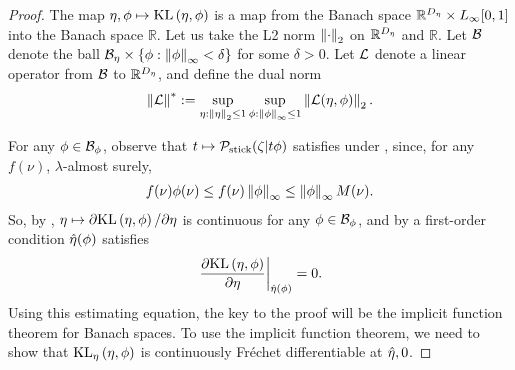 
\begin{proof}
%
The map $\eta, \phi \mapsto \mathrm{KL}\left(\eta, \phi\right)$ is a map from the Banach space
$\mathbb{R}^{D_{\eta}} \times {L_{\infty}[0,1]}$ into the Banach space $\mathbb{R}$. Let us
take the L2 norm $\left\Vert\cdot\right\Vert_2$ on $\mathbb{R}^{{D_{\eta}}}$ and $\mathbb{R}$.
Let $\mathcal{B}$ denote the ball $\mathcal{B}_\eta \times \{ \phi: \left\Vert\phi\right\Vert_{\infty} <
\delta\}$ for some $\delta > 0$.  Let $\mathcal{L}$ denote a linear operator from
$\mathcal{B}$ to $\mathbb{R}^{D_{\eta}}$, and define the dual norm
%
\begin{align*}
%
\norm{\linop}^* :=
    \sup_{\eta: \norm{\eta}_2 \le 1} \sup_{\phi: \norminf{\phi} \le 1}
     \norm{\linop(\eta, \phi)}_2.
%
\end{align*}

For any $\phi \in \mathcal{B}_\phi$, observe that $t \mapsto \mathcal{P}_{\mathrm{stick}}(\zeta \vert t
\phi)$ satisfies  under ,
since, for any $f(\nu)$, $\lambda$-almost surely,
%
\begin{align*}
%
f(\nu) \phi(\nu) \le f(\nu) \norminf{\phi} \le \norminf{\phi} M(\nu).
%
\end{align*}
%
So, by , $\eta \mapsto \partial \mathrm{KL}\left(\eta, \phi\right) /
\partial \eta$ is continuous for any $\phi \in \mathcal{B}_\phi$, and by a first-order
condition $\hat\eta(\phi)$ satisfies
%
\begin{align*}
%
\fracat{\partial \KL{\eta, \phi}}
                {\partial \eta}
                {\etaopt(\phi)} = 0.
%
\end{align*}
%
Using this estimating equation, the key to the proof will be the implicit
function theorem for Banach spaces. To use the implicit function theorem, we
need to show that $\mathrm{KL}_{\eta}\left(\eta, \phi\right)$ is continuously Fr{\'e}chet
differentiable at $\hat\eta, 0$.



\end{proof}
